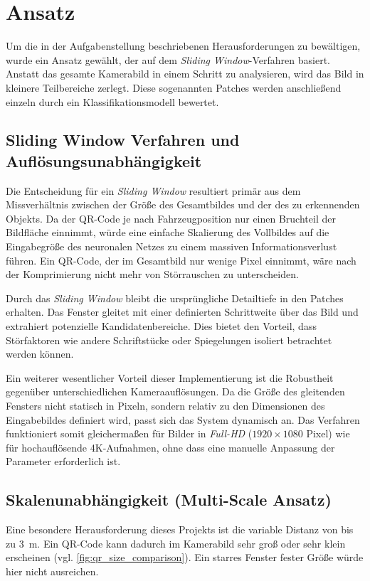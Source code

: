 \documentclass[
    a4paper,        %
    11pt,           %
    ngerman,        %
    parskip=half,   %
    listof=totoc,   %
    bibliography=totoc %
]{scrartcl}
\let\oldsection\section
\renewcommand\section{\clearpage\oldsection}
\begin{document}
\section{Ansatz} \label{sec:ansatz}

Um die in der Aufgabenstellung beschriebenen Herausforderungen zu bewältigen, wurde ein Ansatz gewählt, der auf dem \textit{Sliding Window}-Verfahren basiert. Anstatt das gesamte Kamerabild in einem Schritt zu analysieren, wird das Bild in kleinere Teilbereiche zerlegt. Diese sogenannten Patches werden anschließend einzeln durch ein Klassifikationsmodell bewertet.

\subsection{Sliding Window Verfahren und Auflösungsunabhängigkeit} \label{subsec:sliding_window}
Die Entscheidung für ein \textit{Sliding Window} resultiert primär aus dem Missverhältnis zwischen der Größe des Gesamtbildes und der des zu erkennenden Objekts. Da der QR-Code je nach Fahrzeugposition nur einen Bruchteil der Bildfläche einnimmt, würde eine einfache Skalierung des Vollbildes auf die Eingabegröße des neuronalen Netzes zu einem massiven Informationsverlust führen. Ein QR-Code, der im Gesamtbild nur wenige Pixel einnimmt, wäre nach der Komprimierung nicht mehr von Störrauschen zu unterscheiden.

Durch das \textit{Sliding Window} bleibt die ursprüngliche Detailtiefe in den Patches erhalten. Das Fenster gleitet mit einer definierten Schrittweite über das Bild und extrahiert potenzielle Kandidatenbereiche. Dies bietet den Vorteil, dass Störfaktoren wie andere Schriftstücke oder Spiegelungen isoliert betrachtet werden können.

Ein weiterer wesentlicher Vorteil dieser Implementierung ist die Robustheit gegenüber unterschiedlichen Kameraauflösungen. Da die Größe des gleitenden Fensters nicht statisch in Pixeln, sondern relativ zu den Dimensionen des Eingabebildes definiert wird, passt sich das System dynamisch an. Das Verfahren funktioniert somit gleichermaßen für Bilder in \textit{Full-HD} ($1920 \times 1080$ Pixel) wie für hochauflösende 4K-Aufnahmen, ohne dass eine manuelle Anpassung der Parameter erforderlich ist.

\subsection{Skalenunabhängigkeit (Multi-Scale Ansatz)} \label{subsec:multi_scale}
Eine besondere Herausforderung dieses Projekts ist die variable Distanz von bis zu \SI{3}{\meter}. Ein QR-Code kann dadurch im Kamerabild sehr groß oder sehr klein erscheinen (vgl. \autoref{fig:qr_size_comparison}). Ein starres Fenster fester Größe würde hier nicht ausreichen.
\end{document}
